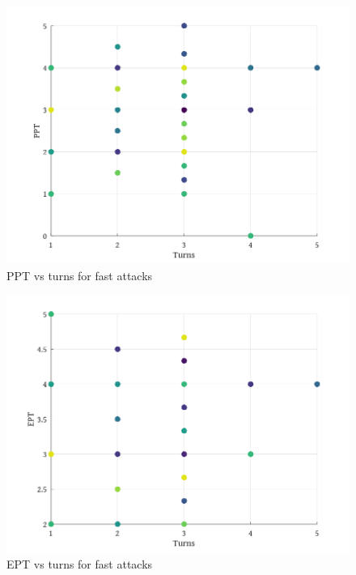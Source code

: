 \begin{figure}[ht]
\includegraphics[keepaspectratio,width=\textwidth]{octave/pptvst.png}
\caption{PPT vs turns for fast attacks}
\label{fig:pptvst}
\end{figure}

\begin{figure}[hb]
\includegraphics[keepaspectratio,width=\textwidth]{octave/eptvst.png}
\caption{EPT vs turns for fast attacks}
\label{fig:eptvst}
\end{figure}

